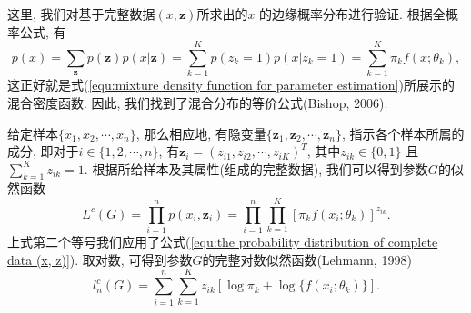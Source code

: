 \documentclass[a4paper,12pt,openany,oneside,utf-8]{ctexbook}
\begin{document}
这里, 我们对基于完整数据$(x, \bm{z})$所求出的$x$ 的边缘概率分布进行验证. 根据全概率公式, 有
\begin{equation}
\label{equ:the marginal distribution of x}
  p(x) = \sum_{\bm{z}} p(\bm{z}) p(x | \bm{z}) = \sum_{k=1}^{K} p(z_k = 1) p(x | z_k = 1) = \sum_{k=1}^{K} \pi_{k} f(x; \theta_{k}),
\end{equation}
这正好就是式(\ref{equ:mixture density function for parameter estimation})所展示的混合密度函数. 因此, 我们找到了混合分布的等价公式(Bishop, 2006).

给定样本$\{x_1, x_2, \cdots, x_n\}$, 那么相应地, 有隐变量$\{ \bm{z}_1, \bm{z}_2, \cdots, \bm{z}_n \}$, 指示各个样本所属的成分, 即对于$i \in \{1, 2, \cdots, n\}$, 有$\bm{z}_i = (z_{i1}, z_{i2}, \cdots, z_{iK})^T$, 其中$z_{ik} \in \{ 0, 1 \}$ 且$\sum_{k=1}^{K}z_{ik}=1$. 根据所给样本及其属性(组成的完整数据), 我们可以得到参数$G$的似然函数
\begin{equation*}
\label{equ:complete likelihood function}
  L^{c}(G)=\prod_{i=1}^{n} p(x_i, \bm{z}_i)=\prod_{i=1}^{n} \prod_{k=1}^{K}[\pi_k f(x_i; \theta_{k})]^{z_{ik}}.
\end{equation*}
上式第二个等号我们应用了公式(\ref{equ:the probability distribution of complete data (x, z)}). 取对数, 可得到参数$G$的完整对数似然函数(Lehmann, 1998)
\begin{equation}
\label{equ:complete log-likelihood function}
  l_{n}^{c}(G)=\sum_{i=1}^{n} \sum_{k=1}^{K} z_{ik} [ \log\pi_{k} + \log\{f(x_{i}; \theta_{k})\} ].
\end{equation}
\end{document}
